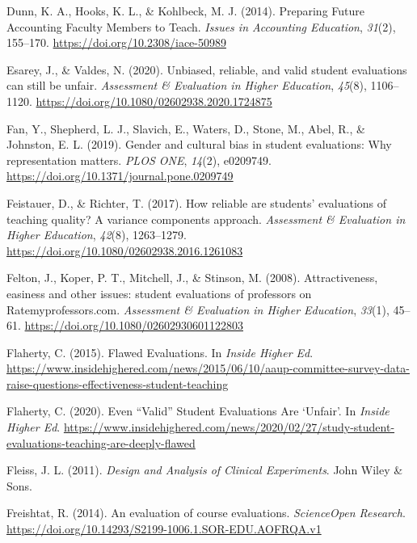 \documentclass[
  man,mask]{apa7}
\newlength{\cslhangindent}
\newenvironment{CSLReferences}[2] %
 {\begin{list}{}{%
  \setlength{\itemindent}{0pt}
  \setlength{\leftmargin}{0pt}
  \setlength{\parsep}{0pt}
  \ifodd #1
   \setlength{\leftmargin}{\cslhangindent}
   \setlength{\itemindent}{-1\cslhangindent}
  \fi
  \setlength{\itemsep}{#2\baselineskip}}}
 {\end{list}}
\begin{document}
\begin{CSLReferences}{1}{0}
Dunn, K. A., Hooks, K. L., \& Kohlbeck, M. J. (2014). Preparing Future Accounting Faculty Members to Teach. \emph{Issues in Accounting Education}, \emph{31}(2), 155--170. \url{https://doi.org/10.2308/iace-50989}

Esarey, J., \& Valdes, N. (2020). Unbiased, reliable, and valid student evaluations can still be unfair. \emph{Assessment \& Evaluation in Higher Education}, \emph{45}(8), 1106--1120. \url{https://doi.org/10.1080/02602938.2020.1724875}

Fan, Y., Shepherd, L. J., Slavich, E., Waters, D., Stone, M., Abel, R., \& Johnston, E. L. (2019). Gender and cultural bias in student evaluations: Why representation matters. \emph{PLOS ONE}, \emph{14}(2), e0209749. \url{https://doi.org/10.1371/journal.pone.0209749}

Feistauer, D., \& Richter, T. (2017). How reliable are students{'} evaluations of teaching quality? A variance components approach. \emph{Assessment \& Evaluation in Higher Education}, \emph{42}(8), 1263--1279. \url{https://doi.org/10.1080/02602938.2016.1261083}

Felton, J., Koper, P. T., Mitchell, J., \& Stinson, M. (2008). Attractiveness, easiness and other issues: student evaluations of professors on Ratemyprofessors.com. \emph{Assessment \& Evaluation in Higher Education}, \emph{33}(1), 45--61. \url{https://doi.org/10.1080/02602930601122803}

Flaherty, C. (2015). Flawed {Evaluations}. In \emph{Inside Higher Ed}. \url{https://www.insidehighered.com/news/2015/06/10/aaup-committee-survey-data-raise-questions-effectiveness-student-teaching}

Flaherty, C. (2020). Even {``{Valid}''} {Student} {Evaluations} {Are} `{Unfair}'. In \emph{Inside Higher Ed}. \url{https://www.insidehighered.com/news/2020/02/27/study-student-evaluations-teaching-are-deeply-flawed}

Fleiss, J. L. (2011). \emph{Design and Analysis of Clinical Experiments}. John Wiley \& Sons.

Freishtat, R. (2014). An evaluation of course evaluations. \emph{ScienceOpen Research}. \url{https://doi.org/10.14293/S2199-1006.1.SOR-EDU.AOFRQA.v1}


\end{CSLReferences}
\end{document}
